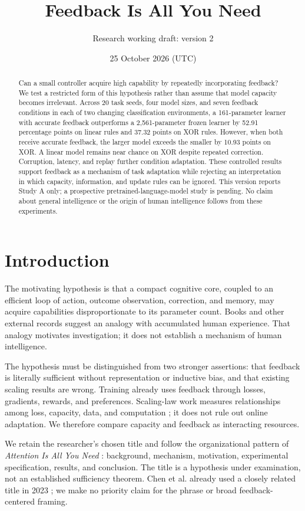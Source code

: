 \documentclass[11pt]{article}
\title{Feedback Is All You Need}
\author{Research working draft: version 2}
\date{25 October 2026 (UTC)}
\begin{document}
\maketitle
\begin{abstract}
Can a small controller acquire high capability by repeatedly incorporating
feedback? We test a restricted form of this hypothesis rather than assume
that model capacity becomes irrelevant. Across 20 task seeds, four model
sizes, and seven feedback conditions in each of two changing classification
environments, a 161-parameter learner with accurate feedback outperforms a
2,561-parameter frozen learner by 52.91 percentage points on linear rules and
37.32 points on XOR rules. However, when both receive accurate feedback, the
larger model exceeds the smaller by 10.93 points on XOR. A linear model remains
near chance on XOR despite repeated correction. Corruption, latency, and replay
further condition adaptation. These controlled results support feedback as a
mechanism of task adaptation while rejecting an interpretation in which
capacity, information, and update rules can be ignored. This version reports
Study A only; a prospective pretrained-language-model study is pending. No
claim about general intelligence or the origin of human intelligence follows
from these experiments.
\end{abstract}

\section{Introduction}
The motivating hypothesis is that a compact cognitive core, coupled to an
efficient loop of action, outcome observation, correction, and memory, may
acquire capabilities disproportionate to its parameter count. Books and other
external records suggest an analogy with accumulated human experience. That
analogy motivates investigation; it does not establish a mechanism of human
intelligence.

The hypothesis must be distinguished from two stronger assertions: that
feedback is literally sufficient without representation or inductive bias,
and that existing scaling results are wrong. Training already uses feedback
through losses, gradients, rewards, and preferences. Scaling-law work measures
relationships among loss, capacity, data, and computation \cite{kaplan,hoffmann};
it does not rule out online adaptation. We therefore compare capacity and
feedback as interacting resources.

We retain the researcher's chosen title and follow the organizational pattern
of \emph{Attention Is All You Need} \cite{vaswani}: background, mechanism,
motivation, experimental specification, results, and conclusion. The title is
a hypothesis under examination, not an established sufficiency theorem.
Chen et al. already used a closely related title in 2023 \cite{chen}; we make
no priority claim for the phrase or broad feedback-centered framing.
\end{document}

